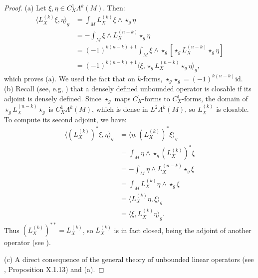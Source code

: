 \documentclass[11pt,letterpaper,reqno,abstract=true]{scrartcl}
\theoremstyle{plain}                              %
\theoremstyle{definition}                         %
\theoremstyle{remark}                             %
\begin{document}
  \begin{proof}
    (a) Let $\xi, \eta \in C^1_X \Lambda^k(M)$. Then:
    \begin{align*}
      \langle L_X^{(k)} \xi, \eta \rangle_g & = \int_M L_X^{(k)} \xi
                                              \wedge \star_g \eta \\
                                            & = - \int_M \xi \wedge L_X^{(n-k)} \star_g \eta \\
      & = (-1)^{k(n-k)+1} \int_M \xi \wedge \star_g [\star_g
        L_X^{(n-k)} \star_g \eta] \\
      & = (-1)^{k(n-k)+1} \langle \xi, \star_g L_X^{(n-k)} \star_g
        \eta \rangle_g,
    \end{align*}
    which proves (a). We used the fact that on $k$-forms, $\star_g
    \star_g = (-1)^{k(n-k)} \text{id}$. \\
    
    \noindent (b) Recall (see, e.g, \cite{conway_fa+2007}) that a
    densely defined unbounded operator is closable if its adjoint is
    densely defined. Since $\star_g$ maps $C^1_X$-forms to
    $C^1_X$-forms, the domain of $\star_g L_X^{(n-k)} \star_g$ is
    $C^1_X \Lambda^k(M)$, which is dense in $L^2 \Lambda^k(M)$, so
    $L_X^{(k)}$ is closable. To compute its second adjoint, we have:
    \begin{align*}
      \langle \left( L_X^{(k)}\right)^\ast \xi, \eta \rangle_g & = \langle
                                                            \eta,
                                                            \left(
                                                            L_X^{(k)}\right)^\ast
                                                            \xi
                                                                 \rangle_g \\
      & = \int_M \eta \wedge \star_g \left( L_X^{(k)}\right)^\ast \xi \\
                                                          & = - \int_M \eta \wedge L_X^{(n-k)} \star_g \xi \\
                                                          & = \int_M L_X^{(k)} \eta \wedge \star_g \xi \\
                                                          & = \langle L_X^{(k)} \eta, \xi \rangle_g \\
      & = \langle \xi, L_X^{(k)} \eta \rangle_g.
    \end{align*}
    Thus $\left( L_X^{(k)} \right)^{\ast \ast} = L_X^{(k)}$, so
    $L_X^{(k)}$ is in fact closed, being the adjoint of another
    operator (see \cite{conway_fa+2007}).

    \medskip
    
    (c) A direct consequence of the general theory of unbounded linear
    operators (see \cite{conway_fa+2007}, Proposition X.1.13) and (a).
  \end{proof}
\end{document}
